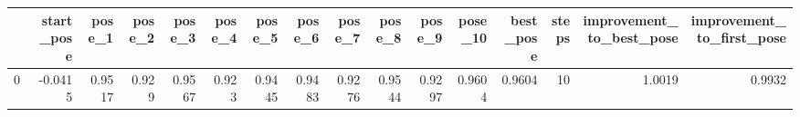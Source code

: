 \begin{tabular}{lrrrrrrrrrrrrrrr}
\toprule
{} &  start\_pose &  pose\_1 &  pose\_2 &  pose\_3 &  pose\_4 &  pose\_5 &  pose\_6 &  pose\_7 &  pose\_8 &  pose\_9 &  pose\_10 &  best\_pose &  steps &  improvement\_to\_best\_pose &  improvement\_to\_first\_pose \\
\midrule
0 &     -0.0415 &  0.9517 &   0.929 &  0.9567 &   0.923 &  0.9445 &  0.9483 &  0.9276 &  0.9544 &  0.9297 &   0.9604 &     0.9604 &     10 &                    1.0019 &                     0.9932 \\
\bottomrule
\end{tabular}

